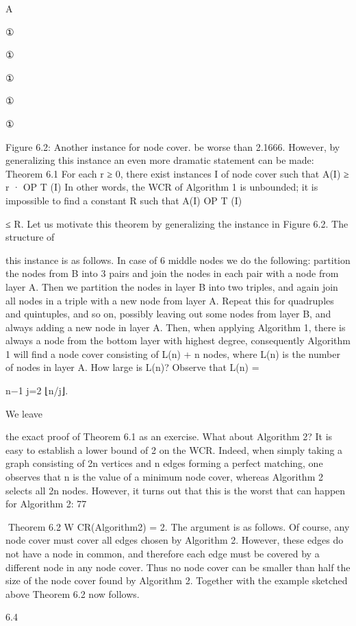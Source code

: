\documentclass[titlepage]{book}
\theoremstyle{plain}
\theoremstyle{definition}
\theoremstyle{remark}
\begin{document}
A

①

①

①

①

①

Figure 6.2: Another instance for node cover.
be worse than 2.1666. However, by generalizing this instance an even more dramatic statement can be
made:
Theorem 6.1 For each r ≥ 0, there exist instances I of node cover such that A(I) ≥ r · OP T (I)
In other words, the WCR of Algorithm 1 is unbounded; it is impossible to find a constant R such that
A(I)
OP T (I)

≤ R. Let us motivate this theorem by generalizing the instance in Figure 6.2. The structure of

this instance is as follows. In case of 6 middle nodes we do the following: partition the nodes from B into
3 pairs and join the nodes in each pair with a node from layer A. Then we partition the nodes in layer
B into two triples, and again join all nodes in a triple with a new node from layer A. Repeat this for
quadruples and quintuples, and so on, possibly leaving out some nodes from layer B, and always adding
a new node in layer A. Then, when applying Algorithm 1, there is always a node from the bottom layer
with highest degree, consequently Algorithm 1 will find a node cover consisting of L(n) + n nodes, where
L(n) is the number of nodes in layer A. How large is L(n)? Observe that L(n) =

n−1
j=2 ⌊n/j⌋.

We leave

the exact proof of Theorem 6.1 as an exercise.
What about Algorithm 2? It is easy to establish a lower bound of 2 on the WCR. Indeed, when simply
taking a graph consisting of 2n vertices and n edges forming a perfect matching, one observes that n is
the value of a minimum node cover, whereas Algorithm 2 selects all 2n nodes. However, it turns out that
this is the worst that can happen for Algorithm 2:
77

Theorem 6.2 W CR(Algorithm2) = 2.
The argument is as follows. Of course, any node cover must cover all edges chosen by Algorithm 2.
However, these edges do not have a node in common, and therefore each edge must be covered by a
different node in any node cover. Thus no node cover can be smaller than half the size of the node cover
found by Algorithm 2. Together with the example sketched above Theorem 6.2 now follows.

6.4
\end{document}
